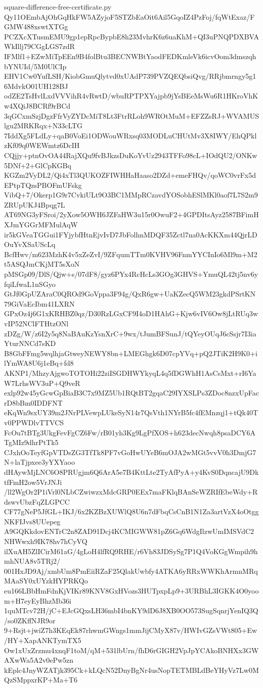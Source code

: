 \documentclass[11pt]{article}
\theoremstyle{definition}
\theoremstyle{remark}
\begin{document}
\begin{filecontents*}[overwrite]{square-difference-free-certificate.py}
Qy11OEmbAjOhGqHkFW5AZyjoF5STZbEaOit6Ail5GqoIZ4PzFoj/fqWtExaz/FGMW488xswtXTGg
PCZXcXTusmEMU9gp1epRpcBypbE8h23MvhrK6z6uaKhM+QI3uPNQPDXBVAWkIllj79CGgLGS7zdR
IFMlf1+EZwMiTpEEn9B4folBtu3BECNWBtYaodFEDKmleVk6icvOom3dmszqhbYNUId/5M0UlCIp
EHV1Cw0YufLSH/KiobGmuQlytvd0xUAdP739PVZQEQbsiQvg/RRjbmrngy5g16MdvkO01UH128BJ
odZE2TsHvlLxdVVVihR4vRwtD/wbuRPTPXYajpb9jYsBEeMsWu6R1HKroVhKw4XQiJ8BCRf9rBCd
3qGCxmSzjDgzFfrVyZYDcMiT8Lt3FtrRLoh9WROtMuM+EFZZsRJ+WVAMUSlgu2MRKRqx+N33cLTG
7IddXg5FLdLy+qaB0VoEi1ODWouWRxsq03MODLuCHUtMv3X8IWY/EhQPklzKf09q0WEWmtz6DcIH
CQjjy+ptnOvOA44RajXQu9fvBJkzsDuKoYvUz2943TFFo98cL+IOdQU2/ONKw5DNf+2+GlCpKGBq
KGZm2VyDL2/Qi4xTl3QUKOZFIWHHaHaaso2DZd+emeFHQv/qoWC0vrFx5dEPtpTQzsPBOFmUFskg
VibQ+7/Okerp1G9r7CvkiULt9O3BC1MMpRCzavdYOSobhESlMKl0aof7L7S2m9ZRUpUKJ4Bpqg7L
AT69NG3yFSroi/2yXow5OWH6JZFaHW3u15r0OwuF2+4GPDItsAyz2587BFimHXJmYGGrMFMulAqW
ir5kGVeaTGGui1FYjybfHtnEjvIvD7JbFolhnMDQF35Zctl7na0AcKKXm44QjrLDOuYvXSaUScLq
BcfHwv/m623MzhK4v5xZeZvI/9ZFqumTTm0KVHV96FnmYYCInIo6Ml9m+M2t5ASQJmCKjMT5sXoN
pMSGp09/DlS/Qjw+s/07dF8/gyz6PYx4RcHcLs3GOg3GHVS+YmuQL42tj5nv6yfqiLfwaL1nSGyo
GtJf0GpUZAraC0QROd9GoVppa3F94g/QxR6gw+UaKZecQ5WM23gkdPSrtKN79GiVaEcIbm41LXRN
GPxOz4j6G1xKRHBZ0qz/D30RzLGxCF9I4oD1HAhG+Kjw6vIV6Ow8jLtRUq3wvIP52NClFTHtzONl
zDZg/W/z6I2y5q8NaBAuKzYsnXrC+9wx/tJumBFSunJ/tQYeyOUqJ6cSsjr7I3iaYturNNCd7sKD
B8GbFFmg5wqlhjaGtweyNEWY8bn+LMEGhgk6D07cpYVq+pQ2JTiK2H9K0+ilYmWA8U6j1eBq+fd8
AKNP1/MhzyAjgwoTOTOHi22ziISGDHWYkyqL4q5fDGWhH1AsCsMxt+rI6YaW7LrhsWV3uP+Q9veR
exlp92w45yGcwGpBiaB3C7x9MZ5Ub1RQtBT2gqaC29IYXSLPs3ZDoc8nzxUpFacrD8bBm0IDDFNT
eKqWn9sxUY39m2JNrPLVewpLUkeSyN14r7QsVth1NYrB5fc4fEMnzqj1+tQk40Tv0PPWDlvTTVCS
FcOu7tBTg3UkgFevFgCZ6Fw/rB01yh3Kg9LgPfXOS+h623decNwqh8psaDCY6ATgMIz9dhrPtTk5
CJxhOoTeyfGpVTDsZG3TfTk8PF7vGoHwUYeB6mOJA2wMGt5vvV0h3DmjG7N+laTjpxee3yYXYaoo
dHAywMjLNC6O8PRUgjm6Q6ArA5e7B4KttLte2TyAfPyA+y4KvS0DqncajU9DktfFmH2ow5VrJNJi
/ll2WgOr2P1iVrl0NLbCZwiwzxMdcGRP0EEx7maFKlqBAnSeWZRIfEbeWdy+RdswvUbzFqZLGPCC
CF77gNeP5JfGL+IKJ/6x2KZBzXUWlQ8U6n7dFbqCsCnB1N1Za3artVzX4oOtggNKFIJvs8UUepeg
A9GQKkdovENTrC2n8ZAD91Dcj4KCMIGWW81pZ6Gq6WdgIlzwUmIMSVdC2NHWwxh9IK78hv7hCyVQ
ilXuAH5ZlICirM61aG/4gLoH4lfRQ9RHE/r6Vh83JDSySg7P1Q4VoKGgWmpih9hmhNUA8v5TRj2/
001HxJD9Aj/xmbUm8PmEiiRZaF25QlakUwbfy4ATKA6yRRxWWKhArmnMRqMAaSY0xUYzkHYPRKQo
eu166LBbHmFdnKjVIKr89KNV8GxHVozs3HUTpxpLp9+3URBhL3IGKK4O0yoom+H7eyEyBhzMb36i
1quMTcv72H/jC+EJcGQxsLH36mbI4bnKY9dD6J8XB0OO573SugSqnrjYenIQ3Q/so0ZKffNJR9or
9+Rsjt+jwiZ7h3KEqEk87rhwmGWngs1mmJijCMyX87v/HWIvGZsVWt805+Ew/HY+XapANKTymTX5
Ow1xUxZrzmu4xnqF1toM/qM+531lbUrn/fhD6rGIGH2VpJpYCAkoBNHXx3GWAXwWa5A2v0ePw5zn
kEplc4JnyWZATjk395Ck+kLQcN52DnyBgNr4usNopTETMBLdBeYHyVz7Lw0MQzSMppxrKP+Ma+T6

\end{filecontents*}
\end{document}
